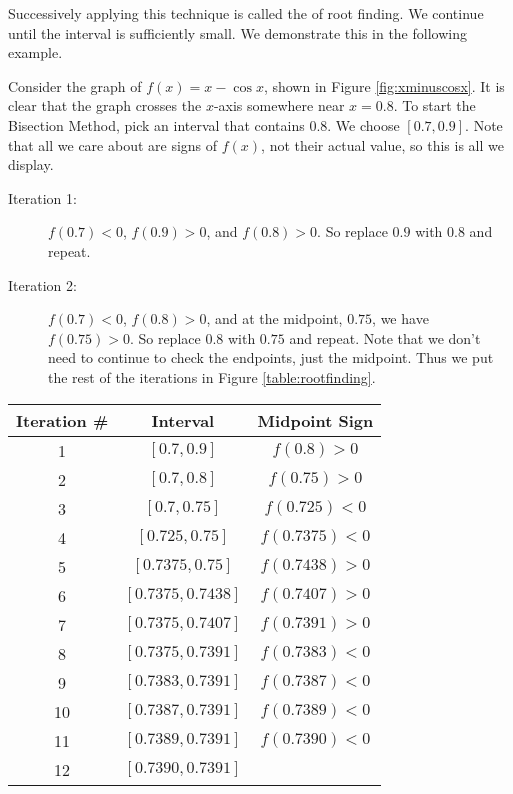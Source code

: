 \enlargethispage{2\baselineskip}	
Successively applying this technique is called the   of root finding. We continue until the interval is sufficiently small. We demonstrate this in the following example.\\

{Consider the graph of $f(x) = x-\cos x$, shown in Figure \ref{fig:xminuscosx}. It is clear that the graph crosses the $x$-axis somewhere near $x=0.8$. To start the Bisection Method, pick an interval that contains $0.8$. We choose $[0.7,0.9]$. Note that all we care about are signs of $f(x)$, not their actual value, so this is all we display.


		\begin{description}
		\item [Iteration 1:] $f(0.7) < 0$, $f(0.9) > 0$, and $f(0.8) >0$. So replace $0.9$ with $0.8$ and repeat.
		\item	[Iteration 2:]	$f(0.7)<0$, $f(0.8) > 0$, and at the midpoint, $0.75$, we have $f(0.75) >0 $. So replace $0.8$ with $0.75$ and repeat. Note that we don't need to continue to check the endpoints, just the midpoint. Thus we put the rest of the iterations in Figure \ref{table:rootfinding}.
		\end{description}
		
%
			{\footnotesize\noindent \begin{tabular}{ccc}
			Iteration \# & Interval & Midpoint Sign \\ \hline
			1		& $[0.7,0.9]$ & $f(0.8) >0$ \\
			2 & $[0.7,0.8] $ & $f(0.75) >0$ \\
			3 & $[0.7,0.75]$ & $f(0.725)<0$\\
			4 & $[0.725,0.75]$ & $f(0.7375)<0$\\
			5 & $[0.7375,0.75]$ & $f(0.7438)>0$\\
			6 & $[0.7375,0.7438]$ & $f(0.7407)>0$\\
			7 & $[0.7375,0.7407]$ & $f(0.7391)>0$\\
			8 & $[0.7375,0.7391]$ & $f(0.7383)<0$\\
			9 & $[0.7383,0.7391]$ & $f(0.7387)<0$\\
			10 & $[0.7387,0.7391]$ & $f(0.7389)<0$\\
			11 & $[0.7389,0.7391]$ & $f(0.7390)<0$\\
			12 & $[0.7390,0.7391]$ &   \\
			\end{tabular}
			}%
			
}

